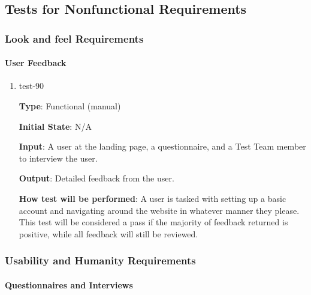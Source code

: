 \documentclass[12pt, titlepage]{article}
\begin{document}
\subsection{Tests for Nonfunctional Requirements}

\subsubsection{Look and feel Requirements}
		
\paragraph{User Feedback}

\begin{enumerate}

\item{test-90\\}

\textbf{Type}: Functional (manual)
					
\textbf{Initial State}: N/A
					
\textbf{Input}: A user at the landing page, a questionnaire, and a Test Team member to interview the user.
					
\textbf{Output}: Detailed feedback from the user.
					
\textbf{How test will be performed}: A user is tasked with setting up a basic account and navigating around the website in whatever manner they please. This test will be considered a pass if the majority of feedback returned is positive, while all feedback will still be reviewed.
					
\end{enumerate}

\subsubsection{Usability and Humanity Requirements}
		
\paragraph{Questionnaires and Interviews}
\end{document}
